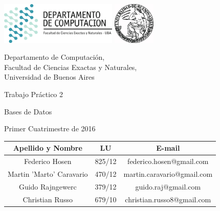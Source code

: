 \documentclass[a4paper, 10pt, twoside]{article}
\newcommand{\titulo}{Trabajo Práctico 2}
\newcommand{\materia}{Bases de Datos}
\newcommand{\cuatrimestre}{Primer Cuatrimestre de 2016}
\begin{document}


\thispagestyle{caratula}

\begin{center}

\includegraphics[height=2cm]{DC.png} 
\hfill
\includegraphics[height=2cm]{UBA.jpg} 

\vspace{2cm}

Departamento de Computación,\\
Facultad de Ciencias Exactas y Naturales,\\
Universidad de Buenos Aires

\vspace{4cm}

\begin{Huge}
\titulo
\end{Huge}

\vspace{0.5cm}

\begin{Large}
\materia
\end{Large}

\vspace{1cm}

\cuatrimestre

\vspace{4cm}

\begin{tabular}{|c|c|c|}
\hline
Apellido y Nombre & LU & E-mail\\
\hline
Federico Hosen  & 825/12 & federico.hosen@gmail.com\\
Martin 'Marto' Caravario  & 470/12 & martin.caravario@gmail.com\\
Guido Rajngewerc  & 379/12 & guido.raj@gmail.com\\
Christian Russo  & 679/10 & christian.russo8@gmail.com\\
\hline
\end{tabular}

\end{center}
\end{document}
